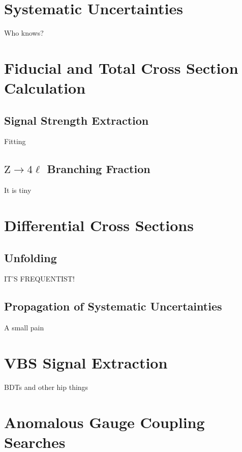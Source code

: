 \section{Systematic Uncertainties}
Who knows?



\section{Fiducial and Total Cross Section Calculation}

\subsection{Signal Strength Extraction}
Fitting


\subsection{\texorpdfstring{$\mathrm{Z} \to 4\ell$}{Z to 4l} Branching Fraction}
It is tiny



\section{Differential Cross Sections}

\subsection{Unfolding}
IT'S FREQUENTIST\@!


\subsection{Propagation of Systematic Uncertainties}
A small pain



\section{VBS Signal Extraction}
BDTs and other hip things



\section{Anomalous Gauge Coupling Searches}
